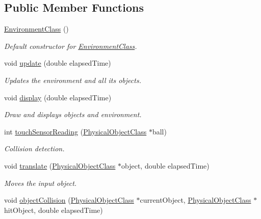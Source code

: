 \subsection*{Public Member Functions}
\begin{DoxyCompactItemize}
\item 
\hypertarget{classEnvironmentClass_aa69ad01551a79f7326f005709061ff31}{\hyperlink{classEnvironmentClass_aa69ad01551a79f7326f005709061ff31}{Environment\-Class} ()}\label{classEnvironmentClass_aa69ad01551a79f7326f005709061ff31}

\begin{DoxyCompactList}\small\item\em Default constructor for \hyperlink{classEnvironmentClass}{Environment\-Class}. \end{DoxyCompactList}\item 
void \hyperlink{classEnvironmentClass_a7d992b6ef4e8b95542af1ae775be988a}{update} (double elapsed\-Time)
\begin{DoxyCompactList}\small\item\em Updates the environment and all its objects. \end{DoxyCompactList}\item 
void \hyperlink{classEnvironmentClass_a0c43d38e65c879efdad9f09a58835c77}{display} (double elapsed\-Time)
\begin{DoxyCompactList}\small\item\em Draw and displays objects and environment. \end{DoxyCompactList}\item 
int \hyperlink{classEnvironmentClass_a3acbe9866577efe3b66527babab09720}{touch\-Sensor\-Reading} (\hyperlink{classPhysicalObjectClass}{Physical\-Object\-Class} $\ast$ball)
\begin{DoxyCompactList}\small\item\em Collision detection. \end{DoxyCompactList}\item 
void \hyperlink{classEnvironmentClass_a0fa52a8dd735412f9d46f4e2499e8108}{translate} (\hyperlink{classPhysicalObjectClass}{Physical\-Object\-Class} $\ast$object, double elapsed\-Time)
\begin{DoxyCompactList}\small\item\em Moves the input object. \end{DoxyCompactList}\item 
void \hyperlink{classEnvironmentClass_a6ce1e78294fb94ac1fc27cf3ef1f0419}{object\-Collision} (\hyperlink{classPhysicalObjectClass}{Physical\-Object\-Class} $\ast$current\-Object, \hyperlink{classPhysicalObjectClass}{Physical\-Object\-Class} $\ast$hit\-Object, double elapsed\-Time)

\end{DoxyCompactItemize}
